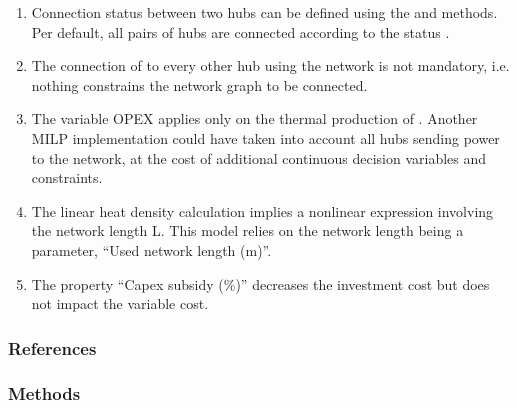 \documentclass[letterpaper,10pt,english]{sphinxmanual}
\begin{document}
\begin{fulllineitems}
\begin{fulllineitems}
\begin{enumerate}
\item {} 
\sphinxAtStartPar
Connection status between two hubs can be defined using the  and  methods.
Per default, all pairs of hubs are connected according to the status .

\item {} 
\sphinxAtStartPar
The connection of  to every other hub using the network is not mandatory,
i.e. nothing constrains the network graph to be connected.

\item {} 
\sphinxAtStartPar
The variable OPEX applies only on the thermal production of .
Another MILP implementation could have taken into account all hubs sending power to the network, at the cost of
additional continuous decision variables and constraints.

\item {} 
\sphinxAtStartPar
The linear heat density calculation implies a non\sphinxhyphen{}linear expression involving the network length L.
This model relies on the network length being a parameter, “Used network length (m)”.

\item {} 
\sphinxAtStartPar
The property “Capex subsidy (\%)” decreases the investment cost but does not impact the variable cost.

\end{enumerate}
\subsubsection*{References}

\end{fulllineitems}

\subsubsection*{Methods}


\begin{savenotes}\sphinxattablestart
\centering
\begin{tabulary}{\linewidth}[t]{}
\hline


\end{tabulary}
\end{savenotes}
\end{fulllineitems}
\end{document}

